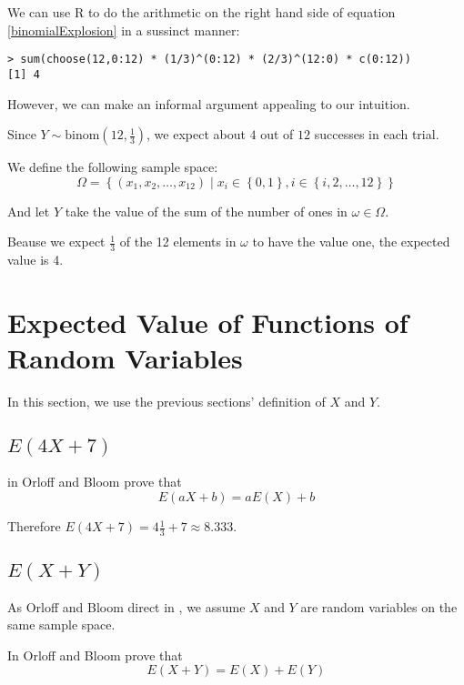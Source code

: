 \documentclass[a4paper,11pt]{article}
\begin{document}
We can use R to do the arithmetic on the right hand side of equation
\ref{binomialExplosion} in a sussinct manner:

\begin{lstlisting}
> sum(choose(12,0:12) * (1/3)^(0:12) * (2/3)^(12:0) * c(0:12))
[1] 4
\end{lstlisting}

However, we can make an informal argument appealing to our intuition.

Since $Y \sim \text{binom} \left( 12, \frac{1}{3} \right)$, we expect
about $4$ out of $12$ successes in each trial.

We define the following sample space:
\begin{equation}
\Omega = \left\{ \left( x_{1}, x_{2}, \ldots, x_{12} \right) \mid 
  x_{i} \in \left\{ 0, 1 \right\}, 
  i \in \left\{ i, 2, \ldots, 12 \right\} \right\}
\end{equation} 

And let $Y$ take the value of the sum of the number of ones in 
$\omega \in \Omega$.

Beause we expect $\frac{1}{3}$ of the 12 elements in $\omega$ to have
the value one, the expected value is 4.

\section{Expected Value of Functions of Random Variables}
In this section, we use the previous sections' definition of $X$ and 
$Y$.

\subsection{$E \left( 4X + 7 \right)$}

in \cite{reading4b} Orloff and Bloom prove that 
\begin{equation}
E \left( aX + b \right) = a E \left( X \right) + b
\end{equation}

Therefore $E \left( 4X + 7 \right) = 4 \frac{1}{3} + 7 \approx 8.333$.

\subsection{ $ E \left( X + Y \right)$ }
As Orloff and Bloom direct in \cite{reading4bQ}, we assume
$X$ and $Y$ are random variables on the same sample space.

In \cite{reading4b} Orloff and Bloom prove that 
\begin{equation}
E \left( X + Y \right) = E \left( X \right) + E \left( Y \right)
\end{equation}
\end{document}
